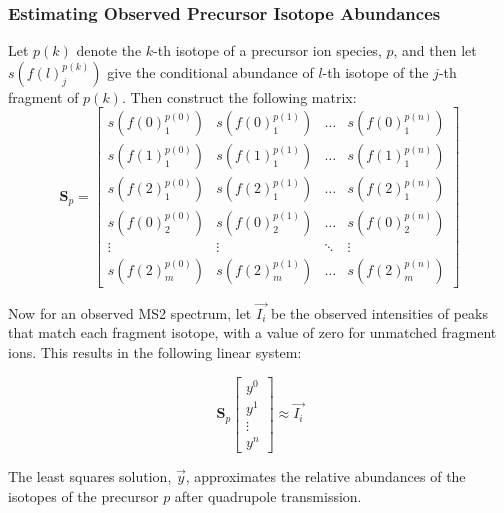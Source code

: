 \documentclass[pdflatex,sn-nature]{sn-jnl}
\begin{document}
\subsubsection{Estimating Observed Precursor Isotope Abundances}\label{subsubsec:estimating-precursor-isotope-abundances}
Let $p(k)$ denote the $k$-th isotope of a precursor ion species, $p$, and then let $s\left(f(l)_{j}^{p(k)}\right)$ give the conditional abundance of $l$-th isotope of the $j$-th fragment of $p(k)$. Then construct the following matrix:
\begin{equation}
\mathbf{S}_{p} = \begin{bmatrix} 
s\left(f(0)_{1}^{p(0)}\right) & s\left(f(0)_{1}^{p(1)}\right) & \hdots & s\left(f(0)_{1}^{p(n)}\right) \\
s\left(f(1)_{1}^{p(0)}\right) & s\left(f(1)_{1}^{p(1)}\right) & \hdots & s\left(f(1)_{1}^{p(n)}\right) \\
s\left(f(2)_{1}^{p(0)}\right) & s\left(f(2)_{1}^{p(1)}\right) & \hdots & s\left(f(2)_{1}^{p(n)}\right) \\
s\left(f(0)_{2}^{p(0)}\right) & s\left(f(0)_{2}^{p(1)}\right) & \hdots & s\left(f(0)_{2}^{p(n)}\right) \\
\vdots & \vdots & \ddots & \vdots \\
s\left(f(2)_{m}^{p(0)}\right) & s\left(f(2)_{m}^{p(1)}\right) & \hdots & s\left(f(2)_{m}^{p(n)}\right)
\end{bmatrix}
\end{equation}

Now for an observed MS2 spectrum, let $\vec{I_{i}}$ be the observed intensities of peaks that match each fragment isotope, with a value of zero for unmatched fragment ions. This results in the following linear system:

\begin{equation}
    \mathbf{S}_p \begin{bmatrix} 
    y^0 \\
    y^1 \\
    \vdots \\
    y^n
\end{bmatrix} \approx \vec{I_{i}}
\end{equation}

The least squares solution, $\vec{y}$, approximates the relative abundances of the isotopes of the precursor $p$ after quadrupole transmission.

\end{document}
